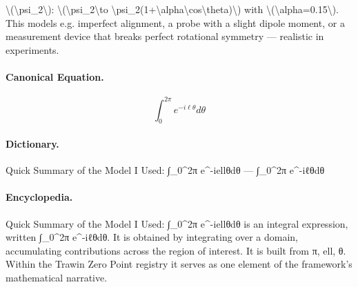 \textbackslash{}(\textbackslash{}psi\_2\textbackslash{}): \textbackslash{}(\textbackslash{}psi\_2\textbackslash{}to \textbackslash{}psi\_2(1+\textbackslash{}alpha\textbackslash{}cos\textbackslash{}theta)\textbackslash{}) with \textbackslash{}(\textbackslash{}alpha=0.15\textbackslash{}). This models e.g. imperfect alignment, a probe with a slight dipole moment, or a measurement device that breaks perfect rotational symmetry — realistic in experiments.

\paragraph{Canonical Equation.}
\[
\int_0^{2\pi} e^{-i\ell\theta}d\theta
\]

\paragraph{Dictionary.}
Quick Summary of the Model I Used: ∫\_0\textasciicircum{}2π e\textasciicircum{}-iellθdθ — ∫\_0\textasciicircum{}2π e\textasciicircum{}-iℓθdθ

\paragraph{Encyclopedia.}
Quick Summary of the Model I Used: ∫\_0\textasciicircum{}2π e\textasciicircum{}-iellθdθ is an integral expression, written ∫\_0\textasciicircum{}2π e\textasciicircum{}-iℓθdθ. It is obtained by integrating over a domain, accumulating contributions across the region of interest. It is built from π, ell, θ. Within the Trawin Zero Point registry it serves as one element of the framework's mathematical narrative.
